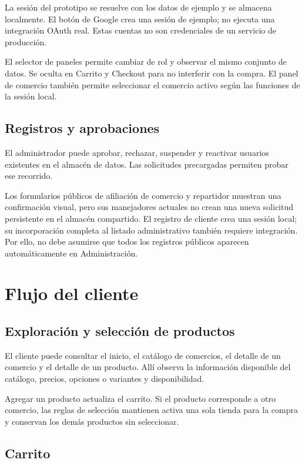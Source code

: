 \documentclass[12pt,letterpaper]{article}
\begin{document}
La sesión del prototipo se resuelve con los datos de ejemplo y se almacena localmente. El botón de Google crea una sesión de ejemplo; no ejecuta una integración OAuth real. Estas cuentas no son credenciales de un servicio de producción.

El selector de paneles permite cambiar de rol y observar el mismo conjunto de datos. Se oculta en Carrito y Checkout para no interferir con la compra. El panel de comercio también permite seleccionar el comercio activo según las funciones de la sesión local.

\subsection{Registros y aprobaciones}

El administrador puede aprobar, rechazar, suspender y reactivar usuarios existentes en el almacén de datos. Las solicitudes precargadas permiten probar ese recorrido.

Los formularios públicos de afiliación de comercio y repartidor muestran una confirmación visual, pero sus manejadores actuales no crean una nueva solicitud persistente en el almacén compartido. El registro de cliente crea una sesión local; su incorporación completa al listado administrativo también requiere integración. Por ello, no debe asumirse que todos los registros públicos aparecen automáticamente en Administración.

\section{Flujo del cliente}

\subsection{Exploración y selección de productos}

El cliente puede consultar el inicio, el catálogo de comercios, el detalle de un comercio y el detalle de un producto. Allí observa la información disponible del catálogo, precios, opciones o variantes y disponibilidad.

Agregar un producto actualiza el carrito. Si el producto corresponde a otro comercio, las reglas de selección mantienen activa una sola tienda para la compra y conservan los demás productos sin seleccionar.

\subsection{Carrito}
\end{document}
